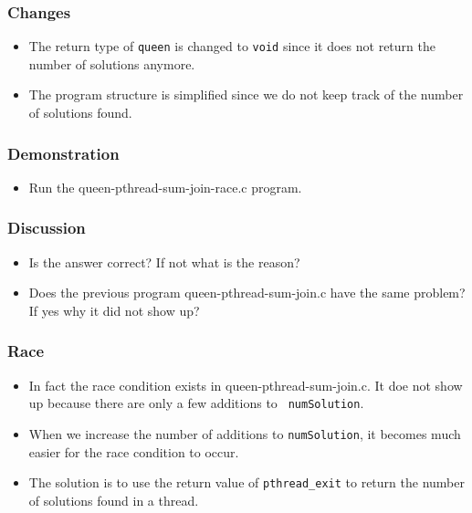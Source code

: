 \documentclass{beamer}
\begin{document}
\begin{frame}
\frametitle{}
\end{frame}

\begin{frame}
\frametitle{Changes}
\begin{itemize}
\item The return type of {\tt queen} is changed to {\tt void} since it
  does not return the number of solutions anymore.
\item The program structure is simplified since we do not keep track
  of the number of solutions found.
\end{itemize}
\end{frame}

\begin{frame}
\frametitle{}
\end{frame}

\begin{frame}
\frametitle{Demonstration}
\begin{itemize}
\item Run the queen-pthread-sum-join-race.c program.
\end{itemize}
\end{frame}

\begin{frame}
\frametitle{Discussion}
\begin{itemize}
\item Is the answer correct? If not what is the reason?
\item Does the previous program queen-pthread-sum-join.c have the same
  problem?  If yes why it did not show up?
\end{itemize}
\end{frame}

\begin{frame}
\frametitle{Race}
\begin{itemize}
\item In fact the race condition exists in queen-pthread-sum-join.c.
  It doe not show up because there are only a few additions to {\tt
    numSolution}.
\item When we increase the number of additions to {\tt numSolution},
  it becomes much easier for the race condition to occur.
\item The solution is to use the return value of {\tt pthread\_exit} to
  return the number of solutions found in a thread.
\end{itemize}
\end{frame}
\end{document}
